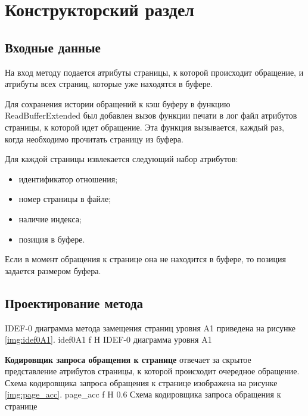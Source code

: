 \chapter{Конструкторский раздел}

\section{Входные данные}
На вход методу подается атрибуты страницы, к которой происходит обращение, и атрибуты всех страниц, которые уже находятся в буфере.

Для сохранения истории обращений к кэш буферу в функцию ReadBufferExtended был добавлен вызов функции печати в лог файл атрибутов страницы, к которой идет обращение.
Эта функция вызывается, каждый раз, когда необходимо прочитать страницу из буфера.

Для каждой страницы извлекается следующий набор атрибутов:
\begin{itemize}
	\item идентификатор отношения;
	\item номер страницы в файле;
	\item наличие индекса;
	\item позиция в буфере.
\end{itemize}

Если в момент обращения к странице она не находится в буфере, то позиция задается размером буфера.

\section{Проектирование метода}
IDEF-0 диаграмма метода замещения страниц уровня A1 приведена на рисунке \ref{img:idef0A1}.
{idef0A1} %
{f} %
{H} %
{\textwidth} %
{IDEF-0 диаграмма уровня A1} %

\textbf{Кодировщик запроса обращения к странице} отвечает за скрытое представление атрибутов страницы, к которой происходит очередное обращение.
Схема кодировщика запроса обращения к странице изображена на рисунке \ref{img:page_acc}.
{page_acc} %
{f} %
{H} %
{0.6\textwidth} %
{Схема кодировщика запроса обращения к странице} %

